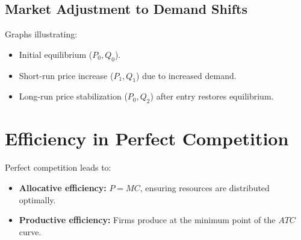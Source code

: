 \subsection*{Market Adjustment to Demand Shifts}
Graphs illustrating:
\begin{itemize}
    \item Initial equilibrium (\(P_0, Q_0\)).
    \item Short-run price increase (\(P_1, Q_1\)) due to increased demand.
    \item Long-run price stabilization (\(P_0, Q_2\)) after entry restores equilibrium.
\end{itemize}

\section*{Efficiency in Perfect Competition}
Perfect competition leads to:
\begin{itemize}
    \item \textbf{Allocative efficiency:} \(P = MC\), ensuring resources are distributed optimally.
    \item \textbf{Productive efficiency:} Firms produce at the minimum point of the \(ATC\) curve.
\end{itemize}